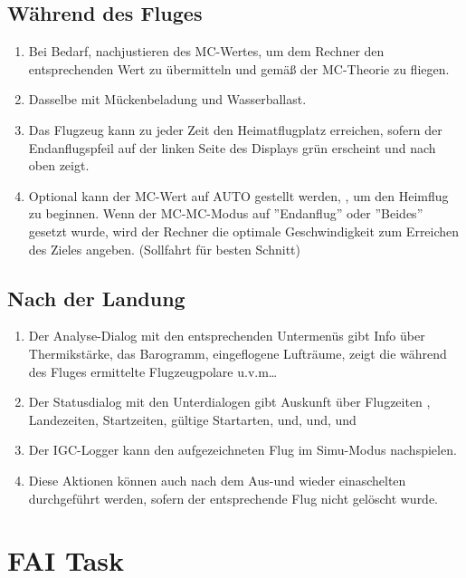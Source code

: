 \subsection*{Während des Fluges}
\begin{enumerate}
\item  Bei Bedarf, nachjustieren des MC-Wertes, um dem Rechner den entsprechenden Wert zu übermitteln und gemäß der MC-Theorie zu fliegen.
\item  Dasselbe mit Mückenbeladung  und Wasserballast.
\item  Das Flugzeug kann zu jeder Zeit den Heimatflugplatz erreichen, sofern der Endanflugspfeil auf der linken Seite des Displays grün erscheint und nach oben zeigt.
\item  Optional kann der MC-Wert auf AUTO gestellt werden, , um den Heimflug zu beginnen.
Wenn der MC-MC-Modus auf ''Endanflug'' oder ''Beides'' gesetzt wurde, wird der
Rechner die optimale Geschwindigkeit zum Erreichen des Zieles angeben. (Sollfahrt für besten Schnitt)
\end{enumerate}

\subsection*{Nach der Landung}

\begin{enumerate}
\item  Der Analyse-Dialog  mit den entsprechenden Untermenüs gibt Info über Thermikstärke, das Barogramm,
eingeflogene Lufträume, zeigt die während des Fluges ermittelte Flugzeugpolare u.v.m\dots
\item  Der Statusdialog   mit den Unterdialogen gibt Auskunft über Flugzeiten , Landezeiten, Startzeiten,
          gültige Startarten, und, und, und
\item   Der IGC-Logger kann den aufgezeichneten Flug im Simu-Modus nachspielen.
\item  Diese Aktionen können auch nach dem Aus-und wieder einaschelten durchgeführt werden, sofern der entsprechende Flug nicht gelöscht wurde.
\end{enumerate}

\section{FAI Task}\label{sec:fai-task}

